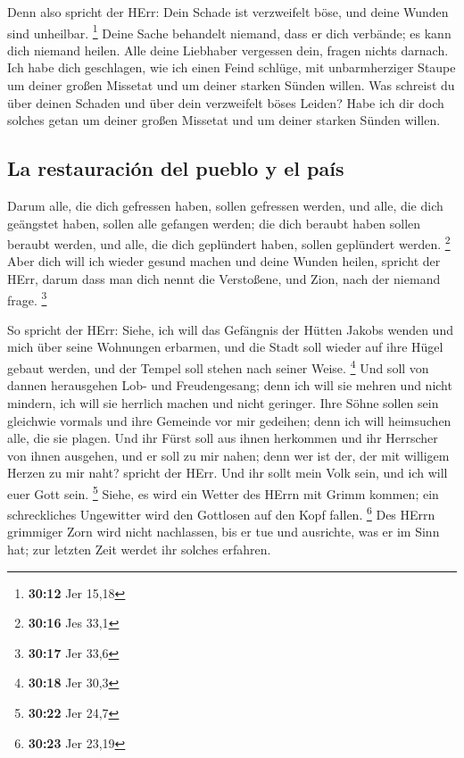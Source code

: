  Denn also spricht der HErr: Dein Schade ist verzweifelt
böse, und deine Wunden sind unheilbar. \footnote{\textbf{30:12} Jer
  15,18}  Deine Sache behandelt niemand, dass er dich
verbände; es kann dich niemand heilen.  Alle deine
Liebhaber vergessen dein, fragen nichts darnach. Ich habe dich
geschlagen, wie ich einen Feind schlüge, mit unbarmherziger Staupe um
deiner großen Missetat und um deiner starken Sünden willen.
 Was schreist du über deinen Schaden und über dein
verzweifelt böses Leiden? Habe ich dir doch solches getan um deiner
großen Missetat und um deiner starken Sünden willen.

\hypertarget{la-restauraciuxf3n-del-pueblo-y-el-pauxeds}{%
\subsection{La restauración del pueblo y el
país}\label{la-restauraciuxf3n-del-pueblo-y-el-pauxeds}}

 Darum alle, die dich gefressen haben, sollen gefressen
werden, und alle, die dich geängstet haben, sollen alle gefangen werden;
die dich beraubt haben sollen beraubt werden, und alle, die dich
geplündert haben, sollen geplündert werden. \footnote{\textbf{30:16} Jes
  33,1}  Aber dich will ich wieder gesund machen und
deine Wunden heilen, spricht der HErr, darum dass man dich nennt die
Verstoßene, und Zion, nach der niemand frage. \footnote{\textbf{30:17}
  Jer 33,6}

 So spricht der HErr: Siehe, ich will das Gefängnis der
Hütten Jakobs wenden und mich über seine Wohnungen erbarmen, und die
Stadt soll wieder auf ihre Hügel gebaut werden, und der Tempel soll
stehen nach seiner Weise. \footnote{\textbf{30:18} Jer 30,3}
 Und soll von dannen herausgehen Lob- und Freudengesang;
denn ich will sie mehren und nicht mindern, ich will sie herrlich machen
und nicht geringer.  Ihre Söhne sollen sein gleichwie
vormals und ihre Gemeinde vor mir gedeihen; denn ich will heimsuchen
alle, die sie plagen.  Und ihr Fürst soll aus ihnen
herkommen und ihr Herrscher von ihnen ausgehen, und er soll zu mir
nahen; denn wer ist der, der mit willigem Herzen zu mir naht? spricht
der HErr.  Und ihr sollt mein Volk sein, und ich will
euer Gott sein. \footnote{\textbf{30:22} Jer 24,7} 
Siehe, es wird ein Wetter des HErrn mit Grimm kommen; ein schreckliches
Ungewitter wird den Gottlosen auf den Kopf fallen. \footnote{\textbf{30:23}
  Jer 23,19}  Des HErrn grimmiger Zorn wird nicht
nachlassen, bis er tue und ausrichte, was er im Sinn hat; zur letzten
Zeit werdet ihr solches erfahren.

